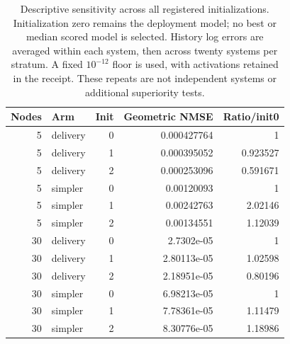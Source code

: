 \begin{table}[ht]
\centering\small
\begin{tabular}{rlrrr}
\toprule
Nodes & Arm & Init & Geometric NMSE & Ratio/init0\\
\midrule
5 & delivery & 0 & 0.000427764 & 1\\
5 & delivery & 1 & 0.000395052 & 0.923527\\
5 & delivery & 2 & 0.000253096 & 0.591671\\
5 & simpler & 0 & 0.00120093 & 1\\
5 & simpler & 1 & 0.00242763 & 2.02146\\
5 & simpler & 2 & 0.00134551 & 1.12039\\
30 & delivery & 0 & 2.7302e-05 & 1\\
30 & delivery & 1 & 2.80113e-05 & 1.02598\\
30 & delivery & 2 & 2.18951e-05 & 0.80196\\
30 & simpler & 0 & 6.98213e-05 & 1\\
30 & simpler & 1 & 7.78361e-05 & 1.11479\\
30 & simpler & 2 & 8.30776e-05 & 1.18986\\
\bottomrule
\end{tabular}
\caption{Descriptive sensitivity across all registered initializations. Initialization zero remains the deployment model; no best or median scored model is selected. History log errors are averaged within each system, then across twenty systems per stratum. A fixed $10^{-12}$ floor is used, with activations retained in the receipt. These repeats are not independent systems or additional superiority tests.}
\label{tab:prospective-init}
\end{table}
